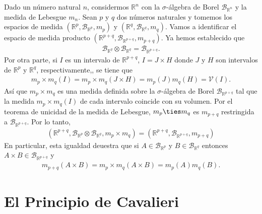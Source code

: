 \begin{obs}
Dado un número natural $n$, considermos $\mathbb{R}^n$ con la $\sigma$-álgebra de Borel $\mathcal{B}_{\mathbb{R}^n}$ y la medida de Lebesgue $m_n$. Sean $p$ y $q$ dos números naturales y tomemos los espacios de medida $(\mathbb{R}^p, \mathcal{B}_{\mathbb{R}^p}, m_p)$ y $(\mathbb{R}^q, \mathcal{B}_{\mathbb{R}^q}, m_q)$. Vamos a identificar el espacio de medida producto $(\mathbb{R}^{p+q}, \mathcal{B}_{\mathbb{R}^{p+q}}, m_{p+q})$. Ya hemos establecido que
\begin{align*}
    \mathcal{B}_{\mathbb{R}^q} \otimes \mathcal{B}_{\mathbb{R}^q} = \mathcal{B}_{\mathbb{R}^{p+q}}.
\end{align*}
Por otra parte, si $I$ es un intervalo de $\mathbb{R}^{p+q}$, $I = J \times H$ donde $J$ y $H$ son intervalos de $\mathbb{R}^p$ y $\mathbb{R}^q$, respectivamente,, se tiene que
\begin{align*}
    m_p \times m_q(I) = m_p \times m_q (J \times H) = m_p(J)m_q(H) = \mathcal{V}(I).
\end{align*}
Así que $m_p \times m_q$ es una medida definida sobre la $\sigma$-álgebra de Borel $\mathcal{B}_{\mathbb{R}^{p+q}}$ tal que la medida $m_p \times m_q(I)$ de cada intervalo coincide con su volumen. Por el teorema de unicidad de la medida de Lebesgue, $m_p \ties m_q$ es $m_{p+q}$ restringida a $\mathcal{B}_{\mathbb{R}^{p+q}}$. Por lo tanto,
\begin{align*}
    (\mathbb{R}^{p+q}, \mathcal{B}_{\mathbb{R}^p} \otimes \mathcal{B}_{\mathbb{R}^q}, m_p \times m_q) = (\mathbb{R}^{p+q}, \mathcal{B}_{\mathbb{R}^{p+q}}, m_{p+q})
\end{align*}
En particular, esta igualdad deuestra que si $A \in \mathcal{B}_{\mathbb{R}^p}$ y $B \in \mathcal{B}_{\mathbb{R}^q}$ entonces $A \times B \in \mathcal{B}_{\mathbb{R}^{p+q}}$ y 
\begin{align*}
    m_{p+q}(A \times B) = m_p \times m_q (A \times B) = m_p(A)m_q(B).
\end{align*}
\end{obs}

\section{El Principio de Cavalieri}

